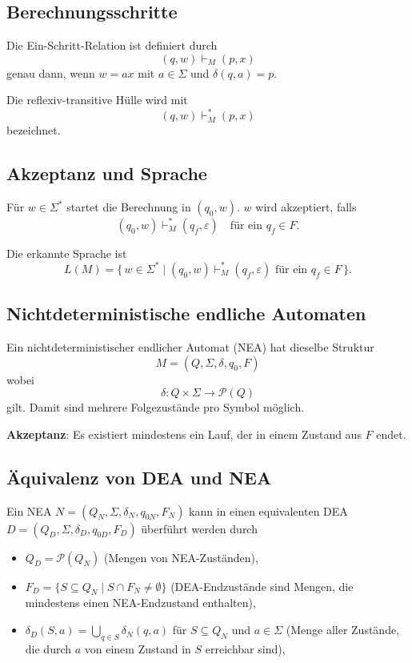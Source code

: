 \subsection{Berechnungsschritte}
Die Ein-Schritt-Relation ist definiert durch
\[
    (q,w) \vdash_M (p,x)
\]
genau dann, wenn \(w=ax\) mit \(a\in\Sigma\) und \(\delta(q,a)=p\).

Die reflexiv-transitive Hülle wird mit
\[
    (q,w) \vdash_M^* (p,x)
\]
bezeichnet.

\subsection{Akzeptanz und Sprache}
Für \(w\in\Sigma^*\) startet die Berechnung in \((q_0,w)\).
\(w\) wird akzeptiert, falls
\[
    (q_0,w) \vdash_M^* (q_f,\varepsilon) \quad\text{für ein } q_f\in F.
\]

Die erkannte Sprache ist
\[
    L(M)=\{\,w\in\Sigma^* \mid (q_0,w)\vdash_M^*(q_f,\varepsilon) \text{ für ein } q_f\in F\,\}.
\]

\subsection{Nichtdeterministische endliche Automaten}
Ein nichtdeterministischer endlicher Automat (NEA) hat dieselbe Struktur
\[
    M = (Q,\Sigma,\delta,q_0,F)
\]
wobei
\[
    \delta : Q \times \Sigma \to \mathcal{P}(Q)
\]
gilt. Damit sind mehrere Folgezustände pro Symbol möglich.

\textbf{Akzeptanz}: Es existiert mindestens ein Lauf, der in einem Zustand aus \(F\) endet.

\subsection{Äquivalenz von DEA und NEA}
Ein NEA \(N=(Q_N,\Sigma,\delta_N,q_{0N},F_N)\) kann in einen equivalenten DEA \(D=(Q_D,\Sigma,\delta_D,q_{0D},F_D)\) überführt werden durch
\begin{itemize}
    \item \(Q_D = \mathcal{P}(Q_N)\) (Mengen von NEA-Zuständen),
    \item \(F_D = \{S \subseteq Q_N \mid S \cap F_N \neq \emptyset\}\) (DEA-Endzustände sind Mengen, die mindestens einen NEA-Endzustand enthalten),
    \item \(\delta_D(S,a) = \bigcup_{q \in S} \delta_N(q,a)\) für \(S \subseteq Q_N\) und \(a \in \Sigma\) (Menge aller Zustände, die durch \(a\) von einem Zustand in \(S\) erreichbar sind),
\end{itemize}

